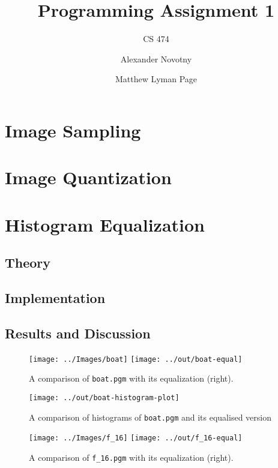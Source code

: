 \documentclass{scrartcl}
\title{Programming Assignment 1}
\subtitle{CS 474}
\author{Alexander Novotny \and Matthew Lyman Page}
\begin{document}
\maketitle

\newpage

\section{Image Sampling}

\section{Image Quantization}

\section{Histogram Equalization}

\subsection{Theory}

\subsection{Implementation}

\subsection{Results and Discussion}

\begin{figure}[H]
	\centering
	\texttt{[image: ../Images/boat]}
	\texttt{[image: ../out/boat-equal]}
	\caption{A comparison of \texttt{boat.pgm} with its equalization (right).}
\end{figure}

\begin{figure}[H]
	\centering\texttt{[image: ../out/boat-histogram-plot]}
	\caption{A comparison of histograms of \texttt{boat.pgm} and its equalised version}
\end{figure}

\begin{figure}[H]
	\centering
	\texttt{[image: ../Images/f\_16]}
	\texttt{[image: ../out/f\_16-equal]}
	\caption{A comparison of \texttt{f\_16.pgm} with its equalization (right).}
\end{figure}
\end{document}
